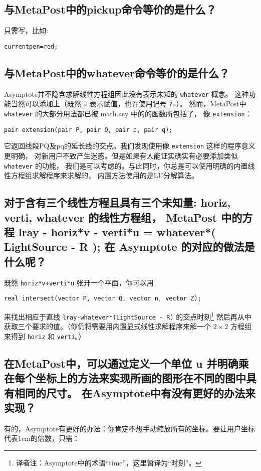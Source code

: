 \subsection{\label{Q8.5}与MetaPost中的pickup命令等价的是什么？}

只需写，比如:

\begin{lstlisting}
currentpen=red;
\end{lstlisting}

\subsection{\label{Q8.6}与MetaPost中的whatever命令等价的是什么？}
Asymptote并不隐含求解线性方程组因此没有表示未知的 \verb|whatever| 概念。
这种功能当然可以添加上（既然 \verb|=| 表示赋值，也许使用记号 \verb|?=|）。
然而，MetaPost中 \verb|whatever| 的大部分用法都已被 math.asy 中的的函数所包括了，
像 \verb|extension|：
\begin{lstlisting}
pair extension(pair P, pair Q, pair p, pair q);
\end{lstlisting}
它返回线段PQ及pq的延长线的交点。我们发现使用像 \verb|extension| 这样的程序意义更明确，
对新用户不致产生迷惑。但是如果有人能证实确实有必要添加类似 \verb|whatever| 的功能，
我们是可以考虑的。与此同时，你总是可以使用明确的内置线性方程组求解程序来求解的，
内置方法使用的是LU分解算法。

\subsection{\label{Q8.7}对于含有三个线性方程且具有三个未知量: horiz, verti, whatever 的线性方程组， MetaPost 中的方程  lray - horiz*v - verti*u = whatever*( LightSource - R ); 在 Asymptote 的对应的做法是什么呢？}
既然 \verb|horiz*v+verti*u| 张开一个平面，你可以用
\begin{lstlisting}
real intersect(vector P, vector Q, vector n, vector Z);
\end{lstlisting}
来找出相应于直线 \verb|lray-whatever*(LightSource - R)| 的交点时刻\footnote{译者注：Asymptote中的术语“time”，这里暂译为“时刻”。}
然后再从中获取三个要求的值。（你仍将需要用内置显式线性求解程序来解一个 $2\times 2$ 方程组来得到 \verb|horiz| 和 \verb|verti|。）

\subsection{\label{Q8.8}在MetaPost中，可以通过定义一个单位 u 并明确乘在每个坐标上的方法来实现所画的图形在不同的图中具有相同的尺寸。
在Asymptote中有没有更好的办法来实现？}
有的，Asymptote有更好的办法：你肯定不想手动缩放所有的坐标。要让用户坐标代表1cm的倍数，只需：

